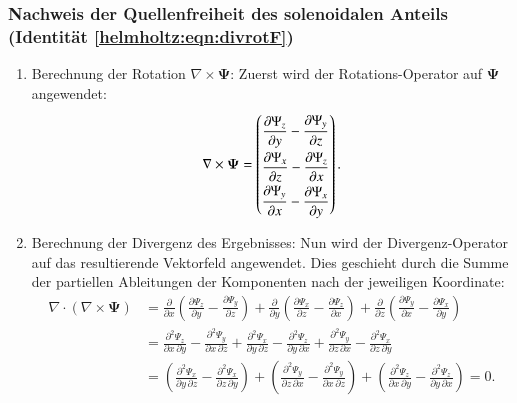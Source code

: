 \subsubsection{Nachweis der Quellenfreiheit des solenoidalen Anteils
(Identität \eqref{helmholtz:eqn:divrotF})}

\begin{enumerate}
    \item Berechnung der Rotation $\nabla \times \boldsymbol{\Psi}$:
	Zuerst wird der Rotations-Operator auf $\boldsymbol{\Psi}$ angewendet:
    \[
    \nabla \times \boldsymbol{\Psi} =
	\renewcommand{\arraystretch}{2.0}
    \begin{pmatrix}
        \displaystyle\frac{\partial \Psi_z}{\partial y} - \frac{\partial \Psi_y}{\partial z} \\
        \displaystyle\frac{\partial \Psi_x}{\partial z} - \frac{\partial \Psi_z}{\partial x} \\
        \displaystyle\frac{\partial \Psi_y}{\partial x} - \frac{\partial \Psi_x}{\partial y}
    \end{pmatrix}.
    \]

    \item Berechnung der Divergenz des Ergebnisses: Nun wird der
    Divergenz-Operator auf das resultierende Vektorfeld angewendet.
    Dies geschieht durch die Summe der partiellen Ableitungen der
    Komponenten nach der jeweiligen Koordinate:
    \begin{align*}
    \nabla \cdot (\nabla \times \boldsymbol{\Psi}) &= \frac{\partial}{\partial x}\left( \frac{\partial \Psi_z}{\partial y} - \frac{\partial \Psi_y}{\partial z} \right) + \frac{\partial}{\partial y}\left( \frac{\partial \Psi_x}{\partial z} - \frac{\partial \Psi_z}{\partial x} \right) + \frac{\partial}{\partial z}\left( \frac{\partial \Psi_y}{\partial x} - \frac{\partial \Psi_x}{\partial y} \right) \\
    &= \frac{\partial^2 \Psi_z}{\partial x\, \partial y} - \frac{\partial^2 \Psi_y}{\partial x\, \partial z} + \frac{\partial^2 \Psi_x}{\partial y\, \partial z} - \frac{\partial^2 \Psi_z}{\partial y\, \partial x} + \frac{\partial^2 \Psi_y}{\partial z\, \partial x} - \frac{\partial^2 \Psi_x}{\partial z\, \partial y} \\
    &= \left( \frac{\partial^2 \Psi_x}{\partial y\, \partial z} - \frac{\partial^2 \Psi_x}{\partial z\, \partial y} \right) + \left( \frac{\partial^2 \Psi_y}{\partial z\, \partial x} - \frac{\partial^2 \Psi_y}{\partial x\, \partial z} \right) + \left( \frac{\partial^2 \Psi_z}{\partial x\, \partial y} - \frac{\partial^2 \Psi_z}{\partial y\, \partial x} \right) = 0.
    \end{align*}
    

\end{enumerate}
